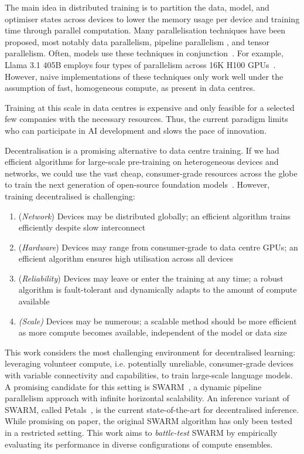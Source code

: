 \documentclass[conference, 10pt]{IEEEtran}
\begin{document}
The main idea in distributed training is to partition the data, model, and
optimiser states across devices to lower the memory usage per device and
training time through parallel computation. Many parallelisation techniques have
been proposed, most notably data parallelism, pipeline parallelism , and tensor
parallelism. Often, models use these techniques in conjunction~\cite{dubey2024,
shoeybi2020}. For example, Llama 3.1 405B employs four types of parallelism
across 16K H100 GPUs~\cite{dubey2024}. However, naive implementations of these
techniques only work well under the assumption of fast, homogeneous compute, as
present in data centres.

Training at this scale in data centres is expensive and only feasible for a
selected few companies with the necessary resources. Thus, the current paradigm
limits who can participate in AI development and slows the pace of innovation.

Decentralisation is a promising alternative to data centre training. If we had
efficient algorithms for large-scale pre-training on heterogeneous devices and
networks, we could use the vast cheap, consumer-grade resources across the globe
to train the next generation of open-source foundation
models~\cite{weisser2024}. However, training decentralised is challenging:

\begin{enumerate}[label=(\arabic*)]
  \item (\textit{Network}) Devices may be distributed globally; an efficient
    algorithm trains efficiently despite slow interconnect
  \item (\textit{Hardware}) Devices may range from consumer-grade to
    data centre GPUs; an efficient algorithm  ensures high utilisation across
    all devices
  \item (\textit{Reliability}) Devices may leave or enter the training at any
    time; a robust algorithm is fault-tolerant and dynamically adapts to the
    amount of compute available
  \item \textit{(Scale)} Devices may be numerous; a scalable method should be
    more efficient as more compute becomes available, independent of the model or
    data size
\end{enumerate}

This work considers the most challenging environment for decentralised learning:
leveraging volunteer compute, i.e. potentially unreliable, consumer-grade
devices with variable connectivity and capabilities, to train large-scale
language models. A promising candidate for this setting is
SWARM~\cite{ryabinin2023}, a dynamic pipeline parallelism approach with infinite
horizontal scalability. An inference variant of SWARM, called
Petals~\cite{borzunov2023}, is the current state-of-the-art for decentralised 
inference. While promising on paper, the original SWARM algorithm has only been
tested in a restricted setting. This work aims to \textit{battle-test} SWARM by
empirically evaluating its performance in diverse configurations of compute
ensembles.
\end{document}
